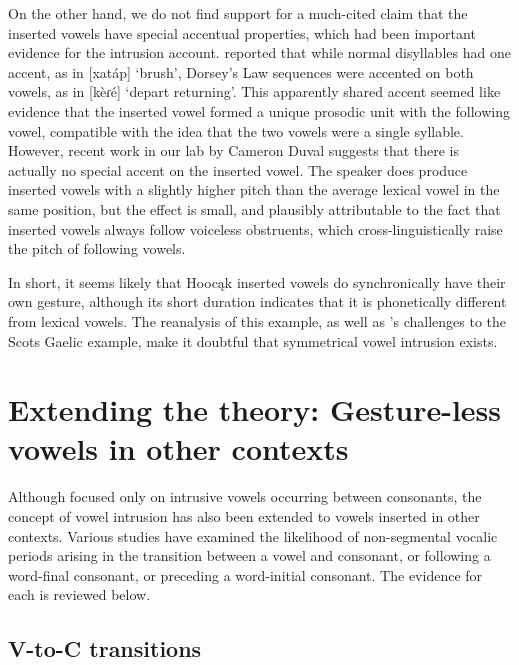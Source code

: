 \documentclass[output=paper,colorlinks,citecolor=brown]{langscibook}
\begin{document}
On the other hand, we do not find support for a much-cited claim that the inserted vowels have special accentual properties, which had been important evidence for the intrusion account. \citet{miner1979dorsey} reported that while normal disyllables had one accent, as in [xatáp] ‘brush’, Dorsey’s Law sequences were accented on both vowels, as in [kèɾé] ‘depart returning’. This apparently shared accent seemed like evidence that the inserted vowel formed a unique prosodic unit with the following vowel, compatible with the idea that the two vowels were a single syllable. However, recent work in our lab by Cameron Duval suggests that there is actually no special accent on the inserted vowel. The speaker does produce inserted vowels with a slightly higher pitch than the average lexical vowel in the same position, but the effect is small, and plausibly attributable to the fact that inserted vowels always follow voiceless obstruents, which cross-linguistically raise the pitch of following vowels. 

In short, it seems likely that Hoocąk inserted vowels do synchronically have their own gesture, although its short duration indicates that it is phonetically different from lexical vowels. The reanalysis of this example, as well as \citet{hammond2014vowel}'s challenges to the Scots Gaelic example, make it doubtful that symmetrical vowel intrusion exists. 

\section{Extending the theory: Gesture-less vowels in other contexts}\label{sec5}

Although \citet{Hall2006} focused only on intrusive vowels occurring between consonants, the concept of vowel intrusion has also been extended to vowels inserted in other contexts. Various studies have examined the likelihood of non-segmental vocalic periods arising in the transition between a vowel and consonant, or following a word-final consonant, or preceding a word-initial consonant. The evidence for each is reviewed below. 

\subsection{V-to-C transitions}
\end{document}
